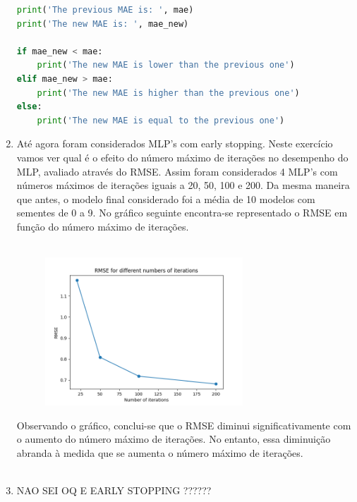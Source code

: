 \documentclass[a4paper,12pt]{article} %
\begin{document}
\begin{enumerate}
\begin{lstlisting}[language=Python]
print('The previous MAE is: ', mae)
print('The new MAE is: ', mae_new)

if mae_new < mae:
    print('The new MAE is lower than the previous one')
elif mae_new > mae:
    print('The new MAE is higher than the previous one')
else:
    print('The new MAE is equal to the previous one')
\end{lstlisting}

\item Até agora foram considerados MLP's com early stopping. Neste exercício vamos
ver qual é o efeito do número máximo de iterações no desempenho do MLP, avaliado através do RMSE.
Assim foram considerados 4 MLP's com números máximos de iterações iguais a 20, 50, 100 e 200. 
Da mesma maneira que antes, o modelo final considerado foi a média de 10 modelos com sementes de 0 a 9. 
No gráfico seguinte encontra-se representado o RMSE em função do número máximo de iterações.\\ \\

\begin{figure}[H]
\centering
\includegraphics[width=0.7\textwidth]{ex3_rmse.png}
\end{figure}

Observando o gráfico, conclui-se que o RMSE diminui significativamente com o aumento do número máximo de iterações.
No entanto, essa diminuição abranda à medida que se aumenta o número máximo de iterações.\\ \\

\item NAO SEI OQ E EARLY STOPPING ?????? 

\end{enumerate}
\end{document}
